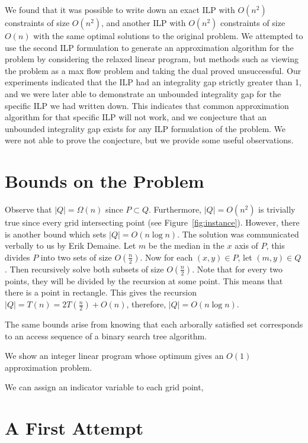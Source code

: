 \documentclass[11pt]{article}
\begin{document}
We found that it was possible to write down an exact ILP with $O(n^2)$ constraints of size $O(n^2)$, and another ILP with $O(n^2)$ constraints of size $O(n)$ with the same optimal solutions to the original problem. We attempted to use the second ILP formulation to generate an approximation algorithm for the problem by considering the relaxed linear program, but methods such as viewing the problem as a max flow problem and taking the dual proved unsuccessful. Our experiments indicated that the ILP had an integrality gap strictly greater than 1, and we were later able to demonstrate an unbounded integrality gap for the specific ILP we had written down. This indicates that common approximation algorithm for that specific ILP will not work, and we conjecture that an unbounded integrality gap exists for any ILP formulation of the problem. We were not able to prove the conjecture, but we provide some useful observations.

\section{Bounds on the Problem}

Observe that $|Q| = \Omega(n)$ since $P \subset Q$. Furthermore, $|Q| = O(n^2)$ is trivially true since every grid intersecting point (see Figure~\ref{fig:instance}). However, there is another bound which sets $|Q| = O(n\log n)$. The solution was communicated verbally to us by Erik Demaine. Let $m$ be the median in the $x$ axis of $P$, this divides $P$ into two sets of size $O(\frac{n}{2})$. Now for each $(x,y) \in P$, let $(m, y) \in Q$. Then recursively solve both subsets of size $O(\frac{n}{2})$. Note that for every two points, they will be divided by the recursion at some point. This means that there is a point in rectangle. This gives the recursion $|Q| = T(n) = 2T(\frac{n}{2}) + O(n)$, therefore, $|Q| = O(n \log n)$. 

The same bounds arise from knowing that each arborally satisfied set corresponds to an access sequence of a binary search tree algorithm. \cite{geometryBST}

We show an integer linear program whose optimum gives an $O(1)$ approximation problem. 


We can assign an indicator variable to each grid point, 

\section{A First Attempt}
\end{document}
